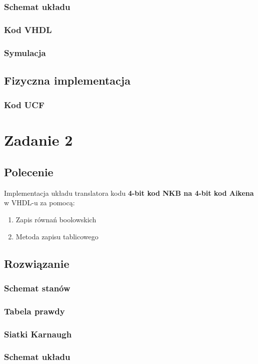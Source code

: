 \documentclass[a4paper,12pt]{extarticle}  %
\begin{document}
\subsubsection{Schemat układu}
\subsubsection{Kod VHDL}
\subsubsection{Symulacja}
\subsection{Fizyczna implementacja}
\subsubsection{Kod UCF}

\section{Zadanie 2}
\subsection{Polecenie}
Implementacja układu translatora kodu \textbf{4-bit kod NKB na 4-bit kod Aikena} w VHDL-u za pomocą:
\begin{enumerate}
	\item Zapis równań boolowskich
	\item Metoda zapisu tablicowego
\end{enumerate}
\subsection{Rozwiązanie}
\subsubsection{Schemat stanów}
\subsubsection{Tabela prawdy}
\subsubsection{Siatki Karnaugh}
\subsubsection{Schemat układu}
\end{document}
